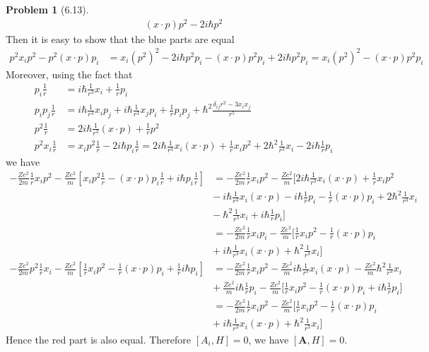 \documentclass[twoside,11pt]{article}
\theoremstyle{definition}
\newtheorem{problem}{Problem}
\theoremstyle{remark}
\begin{document}
\begin{problem}[6.13]
\begin{align*}
    (x\cdot p)p^2 - 2i\hbar p^2
\end{align*}
Then it is easy to show that the blue parts are equal
\begin{align*}
    p^2x_ip^2 - p^2(x\cdot p)p_i &= 
    x_i(p^2)^2 - 2i\hbar p^2p_i 
    -(x\cdot p)p^2p_i + 2i\hbar p^2 p_i=
    x_i(p^2)^2 - (x\cdot p) p^2p_i
\end{align*}
Moreover, using the fact that
\begin{align*}
    p_i\frac{1}{r} &= i\hbar\frac{1}{r^3}x_i + \frac{1}{r}p_i\\
    p_ip_j\frac{1}{r} &= 
    i\hbar\frac{1}{r^3}x_ip_j + i\hbar\frac{1}{r^3}x_jp_i + 
    \frac{1}{r}p_ip_j + \hbar^2
    \frac{\delta_{ij}r^2 - 3x_ix_j}{r^5}\\
    p^2\frac{1}{r} &= 2i\hbar\frac{1}{r^3}(x\cdot p) + \frac{1}{r}p^2\\
    p^2x_i\frac{1}{r} &= x_ip^2\frac{1}{r} - 2i\hbar p_i\frac{1}{r}
    =2i\hbar\frac{1}{r^3}x_i(x\cdot p) + \frac{1}{r}x_ip^2
    +2\hbar^2\frac{1}{r^3}x_i - 2i\hbar\frac{1}{r}p_i
\end{align*}
we have
\begin{align*}
    -\frac{Ze^2}{2m}\frac{1}{r}x_ip^2 - 
    \frac{Ze^2}{m}[x_ip^2\frac{1}{r} - (x\cdot p)p_i\frac{1}{r}
    +i\hbar p_i\frac{1}{r}] &= 
    -\frac{Ze^2}{2m}\frac{1}{r}x_ip^2 - \frac{Ze^2}{m}\Big[
        2i\hbar\frac{1}{r^3}x_i(x\cdot p) + \frac{1}{r}x_ip^2\\
        &-\ i\hbar\frac{1}{r^3}x_i(x\cdot p) - i\hbar\frac{1}{r}p_i 
        - \frac{1}{r}(x\cdot p)p_i + 2\hbar^2\frac{1}{r^3}x_i\\
        &-\ \hbar^2\frac{1}{r^3}x_i + i\hbar\frac{1}{r}p_i
    \Big]\\
    &= -\frac{Ze^2}{2m}\frac{1}{r}x_ip_i - \frac{Ze^2}{m}\Big[
        \frac{1}{r}x_ip^2 - \frac{1}{r}(x\cdot p)p_i\\
    &+\ i\hbar\frac{1}{r^3}x_i(x\cdot p) + \hbar^2\frac{1}{r^3}x_i
    \Big]\\
    -\frac{Ze^2}{2m}p^2\frac{1}{r}x_i 
     - \frac{Ze^2}{m}[\frac{1}{r}x_ip^2 - \frac{1}{r}(x\cdot p)p_i + 
    \frac{1}{r}i\hbar p_i] &= 
    -\frac{Ze^2}{2m}\frac{1}{r}x_i p^2 - \frac{Ze^2}{m}i\hbar\frac{1}{r^3}x_i(x\cdot p)
    -\frac{Ze^2}{m}\hbar^2\frac{1}{r^3}x_i\\
    &+\ \frac{Ze^2}{m}i\hbar\frac{1}{r}p_i - \frac{Ze^2}{m}\Big[\frac{1}{r}x_ip^2 - \frac{1}{r}(x\cdot p)p_i + i\hbar\frac{1}{r}p_i\Big]\\
    &= -\frac{Ze^2}{2m}\frac{1}{r}x_ip^2 - \frac{Ze^2}{m}\Big[\frac{1}{r}x_ip^2 - \frac{1}{r}(x\cdot p)p_i\\
    &+\ i\hbar\frac{1}{r^3}x_i(x\cdot p) + \hbar^2\frac{1}{r^3}x_i\Big]
\end{align*}
Hence the red part is also equal.
Therefore $[A_i, H] = 0$, we have $[\mathbf{A}, H] = 0$.


\end{problem}
\end{document}
